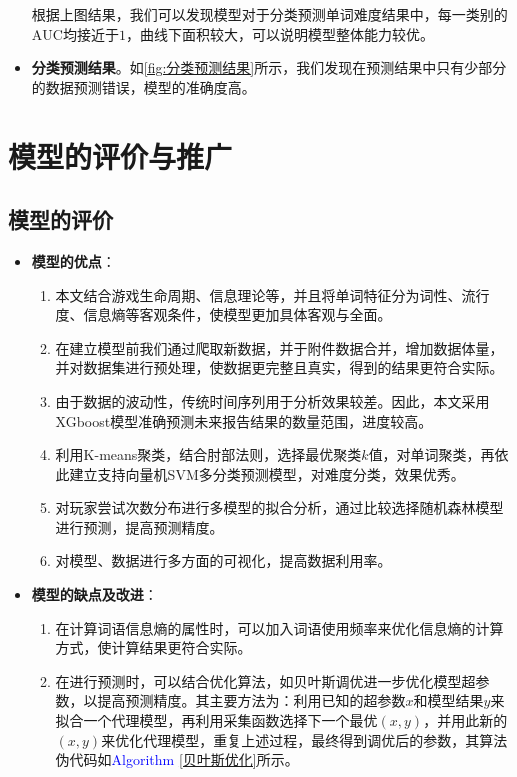 \documentclass{MathModeling}
\begin{document}
\begin{itemize}
		根据上图结果，我们可以发现模型对于分类预测单词难度结果中，每一类别的$\text{AUC}$均接近于$1$，曲线下面积较大，可以说明模型整体能力较优。

		\item \textbf{分类预测结果}。如\textcolor{blue}{\cref{fig:分类预测结果}}所示，我们发现在预测结果中只有少部分的数据预测错误，模型的准确度高。
	\end{itemize}
\section{模型的评价与推广}
	\subsection{模型的评价}
	\begin{itemize}
		\item \textbf{模型的优点}：
			\begin{enumerate}
				\item 本文结合游戏生命周期、信息理论等，并且将单词特征分为词性、流行度、信息熵等客观条件，使模型更加具体客观与全面。
				\item 在建立模型前我们通过爬取新数据，并于附件数据合并，增加数据体量，并对数据集进行预处理，使数据更完整且真实，得到的结果更符合实际。
				\item 由于数据的波动性，传统时间序列用于分析效果较差。因此，本文采用XGboost模型准确预测未来报告结果的数量范围，进度较高。
				\item 利用K-means聚类，结合肘部法则，选择最优聚类$k$值，对单词聚类，再依此建立支持向量机SVM多分类预测模型，对难度分类，效果优秀。
				\item 对玩家尝试次数分布进行多模型的拟合分析，通过比较选择随机森林模型进行预测，提高预测精度。
				\item 对模型、数据进行多方面的可视化，提高数据利用率。
			\end{enumerate}
		\item \textbf{模型的缺点及改进}：
			\begin{enumerate}
				\item 在计算词语信息熵的属性时，可以加入词语使用频率来优化信息熵的计算方式，使计算结果更符合实际。
				\item 在进行预测时，可以结合优化算法，如贝叶斯调优进一步优化模型超参数，以提高预测精度。其主要方法为：利用已知的超参数$x$和模型结果$y$来拟合一个代理模型，再利用采集函数选择下一个最优$\left(x,y\right)$，并用此新的$\left(x,y\right)$来优化代理模型，重复上述过程，最终得到调优后的参数，其算法伪代码如\textcolor{blue}{Algorithm \ref{贝叶斯优化}}所示。
			\end{enumerate}
	\end{itemize}
\end{document}
